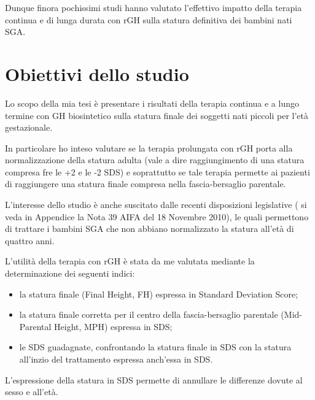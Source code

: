Dunque finora pochissimi studi hanno valutato l'effettivo impatto della terapia continua e di lunga durata con rGH sulla statura definitiva dei bambini nati SGA. 


\section{Obiettivi dello studio}

Lo scopo della mia tesi è presentare i risultati della terapia continua e a lungo termine  con GH biosintetico sulla statura finale dei soggetti nati piccoli per l'età gestazionale.

In particolare ho inteso valutare se la terapia prolungata con rGH porta alla normalizzazione della statura adulta (vale a dire raggiungimento di una statura compresa fre le +2 e le -2 SDS) e soprattutto se tale terapia permette ai pazienti di raggiungere una statura finale compresa nella fascia-bersaglio parentale. 

L'interesse dello studio è anche suscitato dalle recenti disposizioni legislative ( si veda in Appendice la Nota 39 AIFA del 18 Novembre 2010), le quali permettono di trattare i bambini SGA che non abbiano normalizzato la statura all'età di quattro anni. 

L'utilità della terapia con rGH è stata da me valutata mediante la determinazione dei seguenti indici:

\begin{itemize}
\item la statura finale (Final Height, FH) espressa in Standard Deviation Score;
\item la statura finale  corretta per il centro della fascia-bersaglio parentale (Mid-Parental Height, MPH) espressa in SDS;
\item le SDS guadagnate, confrontando la statura finale in SDS con la statura all'inzio del trattamento espressa anch'essa in SDS.
\end{itemize}

L'espressione della statura in SDS permette di annullare le differenze dovute al sesso e all'età.

